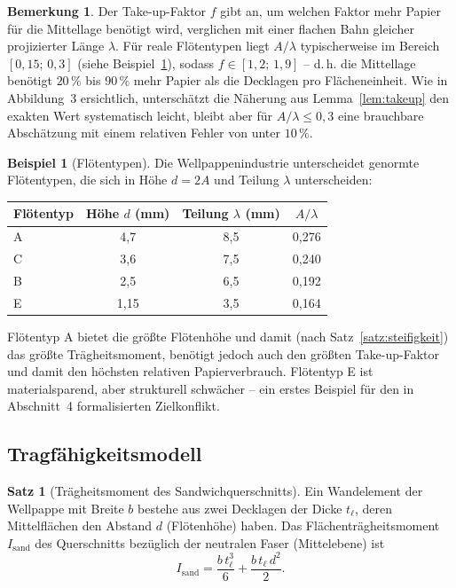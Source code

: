 ﻿\documentclass[a4paper,12pt]{article}
\theoremstyle{definition}
\newtheorem{beispiel}{Beispiel}
\newtheorem{satz}{Satz}
\newtheorem{bemerkung}{Bemerkung}
\begin{document}
\begin{bemerkung}
	Der Take-up-Faktor $f$ gibt an, um welchen Faktor mehr Papier für die
	Mittellage benötigt wird, verglichen mit einer flachen Bahn gleicher
	projizierter Länge $\lambda$. Für reale Flötentypen liegt
	$A/\lambda$ typischerweise im Bereich $[0{,}15;\,0{,}3]$ (siehe
	Beispiel~\ref{bsp:fluten}), sodass $f \in [1{,}2;\,1{,}9]$ -- d.\,h. die
	Mittellage benötigt $20\,\%$ bis $90\,\%$ mehr Papier als die Decklagen pro
	Flächeneinheit. Wie in Abbildung~3 ersichtlich, unterschätzt die
	Näherung aus Lemma~\ref{lem:takeup} den exakten Wert systematisch leicht,
	bleibt aber für $A/\lambda \leq 0{,}3$ eine brauchbare Abschätzung mit einem
	relativen Fehler von unter $10\,\%$.
\end{bemerkung}

\begin{beispiel}[Flötentypen]
	\label{bsp:fluten}
	Die Wellpappenindustrie unterscheidet genormte Flötentypen, die sich in
	Höhe $d = 2A$ und Teilung $\lambda$ unterscheiden:

	\begin{center}
	\begin{tabular}{lccc}
		\textbf{Flötentyp} & \textbf{Höhe $d$ (mm)} & \textbf{Teilung $\lambda$ (mm)} & \textbf{$A/\lambda$} \\
		\hline
		A & 4{,}7 & 8{,}5 & 0{,}276 \\
		C & 3{,}6 & 7{,}5 & 0{,}240 \\
		B & 2{,}5 & 6{,}5 & 0{,}192 \\
		E & 1{,}15 & 3{,}5 & 0{,}164 \\
	\end{tabular}
	\end{center}

	Flötentyp A bietet die größte Flötenhöhe und damit (nach
	Satz~\ref{satz:steifigkeit}) das größte Trägheitsmoment, benötigt jedoch
	auch den größten Take-up-Faktor und damit den höchsten relativen
	Papierverbrauch. Flötentyp E ist materialsparend, aber strukturell
	schwächer -- ein erstes Beispiel für den in Abschnitt~4 formalisierten
	Zielkonflikt.
\end{beispiel}

\subsection{Tragfähigkeitsmodell}

\begin{satz}[Trägheitsmoment des Sandwichquerschnitts]
	\label{satz:traegheit}
	Ein Wandelement der Wellpappe mit Breite $b$ bestehe aus zwei Decklagen der
	Dicke $t_\ell$, deren Mittelflächen den Abstand $d$ (Flötenhöhe) haben. Das
	Flächenträgheitsmoment $I_{\mathrm{sand}}$ des Querschnitts bezüglich der
	neutralen Faser (Mittelebene) ist
	\[
		I_{\mathrm{sand}} = \frac{b\,t_\ell^3}{6} + \frac{b\,t_\ell\,d^2}{2}.
	\]
\end{satz}
\end{document}
